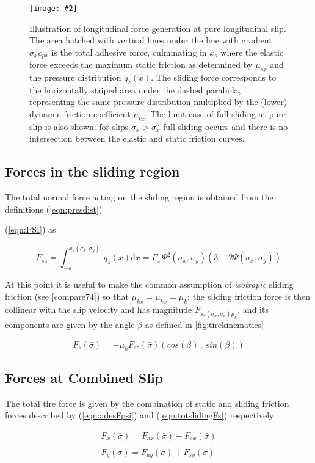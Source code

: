 \documentclass[12pt,a4paper]{report}
\newcommand{\figura}[5][htbp]{
\begin{figure}[#1]
\begin{center}
\texttt{[image: \#2]}
\caption{#4}\label{#5}
\end{center}
\end{figure}
}
\newcommand{\eq}[2]{
\begin{equation} \label{#1}
#2
\end{equation}
}
\newcommand{\req}[1]{
(\ref{#1})
}
\newcommand{\de}[1]{
\mathrm{d} #1 
}
\begin{document}
\figura{pix/sliparabola.jpg}{width=12cm}{Illustration of longitudinal force generation at pure longitudinal slip.
The area hatched with vertical lines under the line with gradient $\sigma_x c_{px}$ is the total adhesive force, culminating in $x_s$ where the elastic force exceeds the maximum static friction as determined by $\mu_{sx}$ and the pressure distribution $q_z(x)$.
The sliding force corresponds to the horizontally striped area under the dashed parabola, representing the same pressure distribution multiplied by the (lower) dynamic friction coefficient $\mu_{kx}$.
The limit case of full sliding at pure slip is also shown: for slips $\sigma_x > \sigma ^{\circ}_x$ full sliding occurs and there is no intersection between the elastic and static friction curves.}{fig:sliparabola}

\subsection*{Forces in the sliding region}
The total normal force acting on the sliding region is obtained from the definitions \req{eqn:presdist} \req{eqn:PSI} as

\eq{eqn:totslidingFz}{F_{sz} = \int_{-a}^{x_s(\sigma_x,\sigma_y)} \: q_z(x) \de{x} = F_z \, \Psi^2(\sigma_x,\sigma_y)(3-2\Psi(\sigma_x,\sigma_y))}

At this point it is useful to make the common assumption of \emph{isotropic} sliding friction (see \ref{compare74}) so that $\mu_{kx} = \mu_{kx} = \mu_{k}$: the sliding friction force is then collinear with the slip velocity and has magnitude $F_{sz(\sigma_x,\sigma_y)\mu_k}$, and its components are given by the angle $\beta$ as defined in \ref{fig:tirekinematics}
\eq{eqn:slidingF}{\bar{F}_{s}(\bar{\sigma}) = -\mu_k F_{sz}(\bar{\sigma})(cos(\beta)\, ,\,sin(\beta))}

\subsection{Forces at Combined Slip}
The total tire force is given by the combination of static and sliding friction forces described by \req{eqn:adesFpsi} and \req{eqn:totslidingFz} respectively:
\eq{eqn:totF}{
\begin{array}{c}
F_{x}(\bar{\sigma}) = F_{ax}(\bar{\sigma}) + F_{sx}(\bar{\sigma})\\
 \\
F_{y}(\bar{\sigma}) = F_{ay}(\bar{\sigma}) + F_{sy}(\bar{\sigma})\\
\end{array}
}
\end{document}
